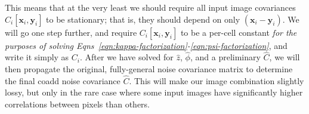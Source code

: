 \documentclass[DM,authoryear,toc]{lsstdoc}
\begin{document}
This means that at the very least we should require all input image covariances $C_i[\bm{x}_i,\bm{y}_i]$ to be stationary; that is, they should depend on only $(\bm{x}_i-\bm{y}_i)$.
We will go one step further, and require $C_i[\bm{x}_i,\bm{y}_i]$ to be a per-cell constant \emph{for the purposes of solving Eqns~\ref{eqn:kappa-factorization}-\ref{eqn:psi-factorization}}, and write it simply as $C_i$.
After we have solved for $\hat{z}$, $\hat{\phi}$, and a preliminary $\hat{C}$, we will then propagate the original, fully-general noise covariance matrix to determine the final coadd noise covariance $\hat{C}$.
This will make our image combination slightly lossy, but only in the rare case where some input images have significantly higher correlations between pixels than others.


\end{document}
